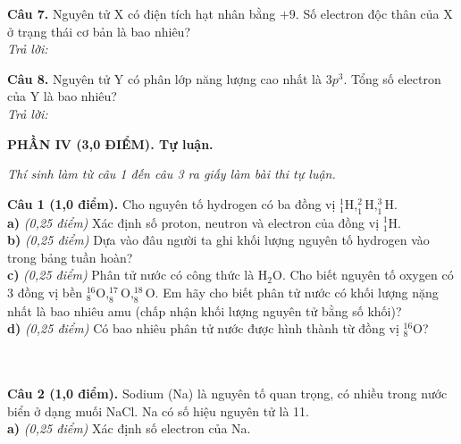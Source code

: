 \documentclass[11pt,a4paper]{article}
\begin{document}
\textbf{Câu 7.} Nguyên tử X có điện tích hạt nhân bằng $+9$. Số electron độc thân của X ở trạng thái cơ bản là bao nhiêu?\\
\textit{Trả lời:} \dotfill\par\vspace{2pt}

\textbf{Câu 8.} Nguyên tử Y có phân lớp năng lượng cao nhất là $3p^3$. Tổng số electron của Y là bao nhiêu?\\
\textit{Trả lời:} \dotfill\par\vspace{2pt}

\vspace{6pt}
{\color{myGreen}\bfseries\large PHẦN IV (3,0 ĐIỂM). Tự luận.}

\textit{\small Thí sinh làm từ câu 1 đến câu 3 ra giấy làm bài thi tự luận.}
\vspace{3pt}

\textbf{Câu 1 (1,0 điểm).} Cho nguyên tố hydrogen có ba đồng vị $^1_1\text{H}, ^2_1\text{H}, ^3_1\text{H}$.\\
\textbf{a)} \textit{(0,25 điểm)} Xác định số proton, neutron và electron của đồng vị $^1_1\text{H}$.\\

\textbf{b)} \textit{(0,25 điểm)} Dựa vào đâu người ta ghi khối lượng nguyên tố hydrogen vào trong bảng tuần hoàn?\\

\textbf{c)} \textit{(0,25 điểm)} Phân tử nước có công thức là $\text{H}_2\text{O}$. Cho biết nguyên tố oxygen có 3 đồng vị bền $^{16}_8\text{O}, ^{17}_8\text{O}, ^{18}_8\text{O}$. Em hãy cho biết phân tử nước có khối lượng nặng nhất là bao nhiêu amu (chấp nhận khối lượng nguyên tử bằng số khối)?\\

\textbf{d)} \textit{(0,25 điểm)} Có bao nhiêu phân tử nước được hình thành từ đồng vị $^{16}_8\text{O}$?\\
\noindent\dotfill\\
\noindent\dotfill\\
\noindent\dotfill\par\vspace{3pt}


\textbf{Câu 2 (1,0 điểm).} Sodium (Na) là nguyên tố quan trọng, có nhiều trong nước biển ở dạng muối NaCl. Na có số hiệu nguyên tử là 11.\\
\textbf{a)} \textit{(0,25 điểm)} Xác định số electron của Na.\\
\end{document}
